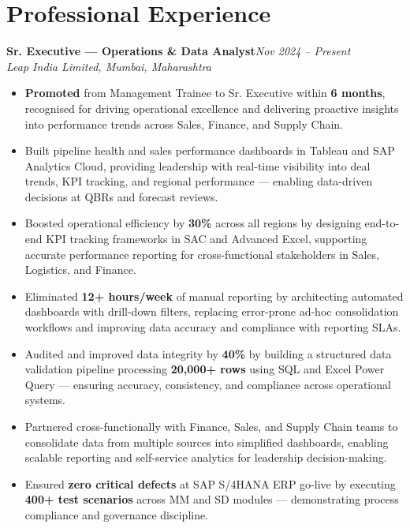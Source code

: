 \documentclass[10pt, letterpaper]{article}
\newcommand{\role}[3]{%
  \vspace{2pt}%
  {\bfseries #1}\hfill{\small\color{muted}\textit{#3}}\\[-2pt]%
  {\small\color{muted}\textit{#2}}%
}
\begin{document}
\section{Professional Experience}

\role{Sr. Executive — Operations \& Data Analyst}{Leap India Limited, Mumbai, Maharashtra}{Nov 2024 – Present}

\begin{itemize}
  \item \textbf{Promoted} from Management Trainee to Sr. Executive within \textbf{6 months}, recognised for driving operational excellence and delivering proactive insights into performance trends across Sales, Finance, and Supply Chain.
  \item Built pipeline health and sales performance dashboards in Tableau and SAP Analytics Cloud, providing leadership with real-time visibility into deal trends, KPI tracking, and regional performance — enabling data-driven decisions at QBRs and forecast reviews.
  \item Boosted operational efficiency by \textbf{30\%} across all regions by designing end-to-end KPI tracking frameworks in SAC and Advanced Excel, supporting accurate performance reporting for cross-functional stakeholders in Sales, Logistics, and Finance.
  \item Eliminated \textbf{12+ hours/week} of manual reporting by architecting automated dashboards with drill-down filters, replacing error-prone ad-hoc consolidation workflows and improving data accuracy and compliance with reporting SLAs.
  \item Audited and improved data integrity by \textbf{40\%} by building a structured data validation pipeline processing \textbf{20,000+ rows} using SQL and Excel Power Query — ensuring accuracy, consistency, and compliance across operational systems.
  \item Partnered cross-functionally with Finance, Sales, and Supply Chain teams to consolidate data from multiple sources into simplified dashboards, enabling scalable reporting and self-service analytics for leadership decision-making.
  \item Ensured \textbf{zero critical defects} at SAP S/4HANA ERP go-live by executing \textbf{400+ test scenarios} across MM and SD modules — demonstrating process compliance and governance discipline.
\end{itemize}

\vspace{1pt}
\end{document}
